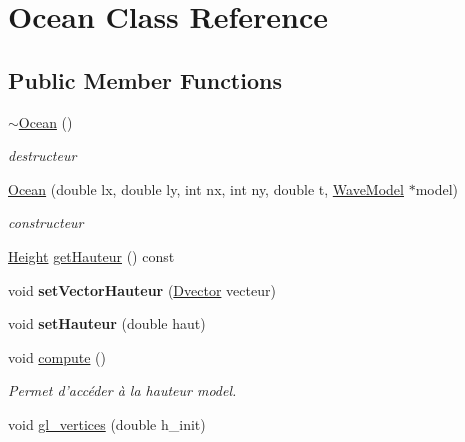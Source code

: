\hypertarget{classOcean}{\section{Ocean Class Reference}
\label{classOcean}
}
\subsection*{Public Member Functions}
\begin{DoxyCompactItemize}
\item 
\hypertarget{classOcean_ae95ec123060d04d915786e179b5cb9d4}{\hyperlink{classOcean_ae95ec123060d04d915786e179b5cb9d4}{$\sim$\-Ocean} ()}\label{classOcean_ae95ec123060d04d915786e179b5cb9d4}

\begin{DoxyCompactList}\small\item\em destructeur \end{DoxyCompactList}\item 
\hyperlink{classOcean_ad22d62e38937baed49b9caa07389353e}{Ocean} (double lx, double ly, int nx, int ny, double t, \hyperlink{classWaveModel}{Wave\-Model} $\ast$model)
\begin{DoxyCompactList}\small\item\em constructeur \end{DoxyCompactList}\item 
\hyperlink{classHeight}{Height} \hyperlink{classOcean_aa21e615ed5fd15a78c7ccee3c91e2fe3}{get\-Hauteur} () const 
\item 
\hypertarget{classOcean_a4376d66f1d9616a48655d195ac442b12}{void {\bfseries set\-Vector\-Hauteur} (\hyperlink{classDvector}{Dvector} vecteur)}\label{classOcean_a4376d66f1d9616a48655d195ac442b12}

\item 
\hypertarget{classOcean_aff51c24de31612bfdd97ab64becc44f4}{void {\bfseries set\-Hauteur} (double haut)}\label{classOcean_aff51c24de31612bfdd97ab64becc44f4}

\item 
\hypertarget{classOcean_ac140ad8d9c78fbf179d83102b4ef4d06}{void \hyperlink{classOcean_ac140ad8d9c78fbf179d83102b4ef4d06}{compute} ()}\label{classOcean_ac140ad8d9c78fbf179d83102b4ef4d06}

\begin{DoxyCompactList}\small\item\em Permet d'accéder à la hauteur model. \end{DoxyCompactList}\item 
\hypertarget{classOcean_ad49f987b9a82294ea0a44ba7ffd63278}{void \hyperlink{classOcean_ad49f987b9a82294ea0a44ba7ffd63278}{gl\-\_\-vertices} (double h\-\_\-init)}\label{classOcean_ad49f987b9a82294ea0a44ba7ffd63278}


\end{DoxyCompactItemize}

